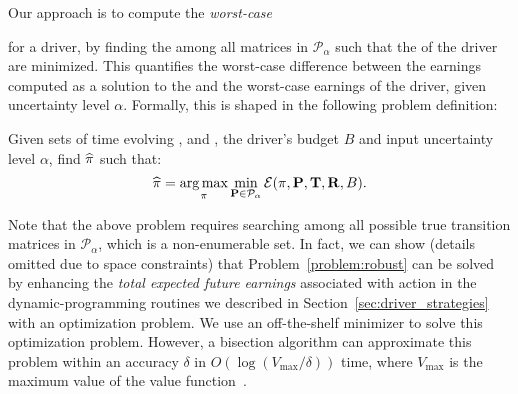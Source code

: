 Our approach is to compute the \emph{worst-case}{ {\totalexpectedearnings} for a driver, by
  finding the {\truetransitionmatrix} among all matrices in $\mathcal{P}_\alpha$ 
 such that the {\totalexpectedearnings} of the driver
 are minimized.  
This quantifies the worst-case difference between the earnings computed
as a solution to the {\originalproblem} and the worst-case earnings of the
driver, given uncertainty level $\alpha$.
Formally, this is shaped in the following problem definition:

\begin{problem}[{\robustproblem}]\label{problem:robust}
Given sets of time evolving {\countmatrix}, {\traveltimematrix} and {\rewardsmatrix}, the driver's budget $B$ and input uncertainty level $\alpha$,
find $\widehat{\pi}$
such that:
\[  \widehat{\pi} = \operatorname*{arg\,max}_{\pi}
\min_{{\mathbf{P}}\in\mathcal{P}_\alpha}\mathcal{E}(\pi,{\mathbf{P}},{\mathbf{T}},{\mathbf{R}},B).
\]
\end{problem}
Note that the above problem requires searching among all possible true transition 
matrices in $\mathcal{P}_\alpha$, which is a non-enumerable set. 
In fact, we can show (details omitted due to space constraints) that 
Problem~\ref{problem:robust} can be solved by enhancing the \emph{total expected future earnings} associated with {\getpassenger} action in the  dynamic-programming routines we described in Section~\ref{sec:driver_strategies}
with an optimization problem. We use an off-the-shelf minimizer to solve this optimization problem. However, a bisection algorithm can approximate this problem within an accuracy $\delta$ in $O(\log(V_{\max}/\delta))$ time, where $V_{\max}$ is the maximum value of the value function~\cite{nilim2004robustness}.


}
